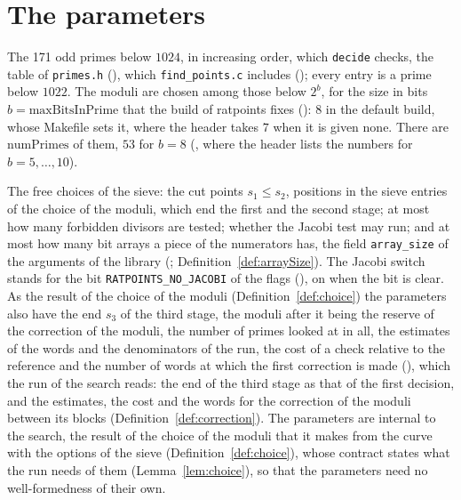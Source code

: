 \section{The parameters}\label{sec:params}

\begin{definition}\label{def:primeTable}
  \leanok
  The 171 odd primes below $1024$, in increasing order, which \verb|decide| checks, the table of
  \verb|primes.h| (), which \verb|find_points.c| includes
  (); every entry is a prime below $1022$. The moduli are chosen
  among those below $2^b$, for the size in bits $b = \mathrm{maxBitsInPrime}$ that the build of
  ratpoints fixes (): $8$ in the default build, whose Makefile sets
  it, where the header takes $7$ when it is given none. There are $\mathrm{numPrimes}$ of them, $53$
  for $b = 8$ (, where the header lists the numbers for
  $b = 5, \dots, 10$).
\end{definition}

\begin{definition}\label{def:Params}
  \leanok
  The free choices of the sieve: the cut points $s_1 \le s_2$, positions in the sieve entries of the
  choice of the moduli, which end the first and the second stage; at most how many forbidden
  divisors are tested; whether the Jacobi test may run; and at most how many bit arrays a piece of
  the numerators has, the field \verb|array_size| of the arguments of the library
  (; Definition~\ref{def:arraySize}). The Jacobi switch stands for
  the bit \verb|RATPOINTS_NO_JACOBI| of the flags (), on when the bit
  is clear. As the result of the choice of the moduli (Definition~\ref{def:choice}) the parameters
  also have the end $s_3$ of the third stage, the moduli after it being the reserve of the
  correction of the moduli, the number of primes looked at in all, the estimates of the words and
  the denominators of the run, the cost of a check relative to the reference and the number of words
  at which the first correction is made (), which the run of the
  search reads: the end of the third stage as that of the first decision, and the estimates, the
  cost and the words for the correction of the moduli between its blocks
  (Definition~\ref{def:correction}). The parameters are internal to the search, the result of the
  choice of the moduli that it makes from the curve with the options of the sieve
  (Definition~\ref{def:choice}), whose contract states what the run needs of them
  (Lemma~\ref{lem:choice}), so that the parameters need no well-formedness of their own.
\end{definition}

